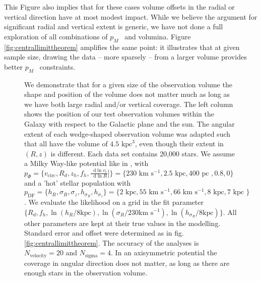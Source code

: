 \documentclass[12pt,preprint]{aastex}
\newcommand*\diff{\mathop{}\!\mathrm{d}}
\newcommand{\pmodel}{\ensuremath{p_M}}
\begin{document}
This Figure also implies that for these cases volume offsets in the radial or vertical direction have at most modest impact. While we believe the argument for significant radial and vertical extent is generic, we have not done a full exploration of all combinations of \pmodel~ and volumina. Figure \ref{fig:centrallimittheorem}  amplifies the same point: it illustrates that at given sample size, drawing the data -- more sparsely -- from a larger volume provides better \pmodel~ constraints. 



\begin{figure}
\caption{We demonstrate that for a given size of the observation volume the shape and position of the volume does not matter much as long as we have both large radial and/or vertical coverage. The left column shows the position of our test observation volumes within the Galaxy with respect to the Galactic plane and the sun. The angular extent of each wedge-shaped observation volume was adapted such that all have the volume of $4.5 \text{ kpc}^3$, even though their extent in $(R,z)$ is different. Each data set contains 20,000 stars. We assume a Milky Way-like potential like in \citet{bov13}, with  $p_\Phi = \{v_\text{circ},R_d,z_h,f_h,\frac{\diff\ln v_c}{\diff\ln R}] \}=\{230 \text{ km s$^{-1}$},2.5\text{ kpc},400 \text{ pc }, 0.8,0\}$ and a 'hot' stellar population with $p_\text{DF} = \{ h_R, \sigma_R, \sigma_z,h_{\sigma_R},h_{\sigma_z}\} =\{2 \text{ kpc}, 55 \text{ km s$^{-1}$}, 66 \text{ km s$^{-1}$}, 8 \text{ kpc}, 7 \text{ kpc }\} $. We evaluate the likelihood on a grid in the fit parameter $\{R_d,f_h,\ln(h_R/8\text{kpc}),\ln(\sigma_{R}/230 \text{km s$^{-1}$}),\ln(h_{\sigma_R}/8\text{kpc}) \}$. All other parameters are kept at their true values in the modelling. Standard error and offset were determined as in fig. \ref{fig:centrallimittheorem}. The accuracy of the analyses is $N_\text{velocity} = 20$ and $N_\text{sigma} = 4$. In an axisymmetric potential the coverage in angular direction does not matter, as long as there are enough stars in the observation volume.}
\label{fig:obsvolumetest}
\end{figure}
\end{document}
